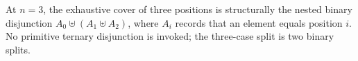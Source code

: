 \documentclass[11pt]{article}
\begin{document}
\begin{code}%
\>[0]\<%
\\
\>[0]\AgdaSpace{}%
\AgdaSymbol{:}\<%
\\
\>[0][@{}l@{\AgdaIndent{0}}]%
\>[2]\AgdaSymbol{\{}\AgdaSpace{}%
\AgdaSymbol{:}\AgdaSpace{}%
\AgdaSymbol{\}}\AgdaSpace{}%
\AgdaSymbol{(}\AgdaSpace{}%
\AgdaSymbol{:}\AgdaSpace{}%
\AgdaSpace{}%
\AgdaSymbol{)}\AgdaSpace{}%
\<%
\\
%
\>[2]\AgdaSymbol{(}\AgdaSpace{}%
\AgdaSpace{}%
\AgdaSymbol{:}\AgdaSpace{}%
\AgdaSpace{}%
\AgdaSymbol{)}\AgdaSpace{}%
\AgdaSpace{}%
\AgdaSpace{}%
\AgdaSymbol{(}\AgdaSpace{}%
\AgdaSpace{}%
\AgdaSymbol{)}\AgdaSpace{}%
\<%
\\
%
\>[2]\AgdaSpace{}%
\AgdaSymbol{(}\AgdaSpace{}%
\AgdaSpace{}%
\AgdaSpace{}%
\AgdaSpace{}%
\AgdaSpace{}%
\AgdaSpace{}%
\AgdaSymbol{)}\<%
\\
\>[0]\AgdaSpace{}%
\AgdaSymbol{=}\AgdaSpace{}%
\<%
\end{code}

At $n=3$, the exhaustive cover of three positions is structurally the
nested binary disjunction $A_0 \uplus (A_1 \uplus A_2)$, where $A_i$
records that an element equals position $i$.  No primitive ternary
disjunction is invoked; the three-case split is two binary splits.
\end{document}
